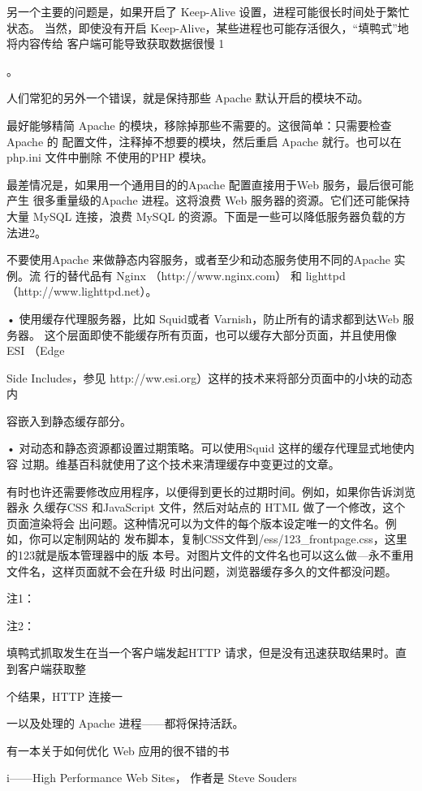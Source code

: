 另一个主要的问题是，如果开启了 Keep-Alive 设置，进程可能很长时间处于繁忙状态。
当然，即使没有开启 Keep-Alive，某些进程也可能存活很久，“填鸭式”地将内容传给
客户端可能导致获取数据很慢 1

。

人们常犯的另外一个错误，就是保持那些 Apache 默认开启的模块不动。

最好能够精简 Apache 的模块，移除掉那些不需要的。这很简单：只需要检查 Apache 的
配置文件，注释掉不想要的模块，然后重启 Apache 就行。也可以在php.ini 文件中删除
不使用的PHP 模块。

最差情况是，如果用一个通用目的的Apache 配置直接用于Web 服务，最后很可能产生
很多重量级的Apache 进程。这将浪费 Web 服务器的资源。它们还可能保持大量 MySQL
连接，浪费 MySQL 的资源。下面是一些可以降低服务器负载的方法进2。

不要使用Apache 来做静态内容服务，或者至少和动态服务使用不同的Apache 实例。流
行的替代品有 Nginx （http://www.nginx.com） 和 lighttpd （http://www.lighttpd.net）。

• 使用缓存代理服务器，比如 Squid或者 Varnish，防止所有的请求都到达Web 服务器。
这个层面即使不能缓存所有页面，也可以缓存大部分页面，并且使用像 ESI （Edge

Side Includes，参见 http://ww.esi.org）这样的技术来将部分页面中的小块的动态内

容嵌入到静态缓存部分。

• 对动态和静态资源都设置过期策略。可以使用Squid 这样的缓存代理显式地使内容
过期。维基百科就使用了这个技术来清理缓存中变更过的文章。

有时也许还需要修改应用程序，以便得到更长的过期时间。例如，如果你告诉浏览器永
久缓存CSS 和JavaScript 文件，然后对站点的 HTML 做了一个修改，这个页面渲染将会
出问题。这种情况可以为文件的每个版本设定唯一的文件名。例如，你可以定制网站的
发布脚本，复制CSS文件到/ess/123\_frontpage.css，这里的123就是版本管理器中的版
本号。对图片文件的文件名也可以这么做—永不重用文件名，这样页面就不会在升级
时出问题，浏览器缓存多久的文件都没问题。

注1：

注2：

填鸭式抓取发生在当一个客户端发起HTTP 请求，但是没有迅速获取结果时。直到客户端获取整

个结果，HTTP 连接一

一以及处理的 Apache 进程——都将保持活跃。

有一本关于如何优化 Web 应用的很不错的书

i——High Performance Web Sites， 作者是 Steve Souders

